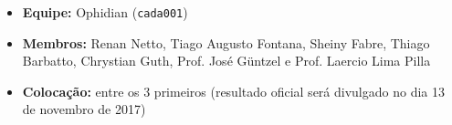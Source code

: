 \begin{itemize}
\item \textbf{Equipe:} Ophidian (\texttt{cada001})
\item \textbf{Membros:} Renan Netto, Tiago Augusto Fontana, Sheiny Fabre, Thiago Barbatto, Chrystian Guth, Prof. José Güntzel e Prof. Laercio Lima Pilla
\item \textbf{Colocação:} entre os 3 primeiros (resultado oficial será divulgado no dia 13 de novembro de 2017)
\end{itemize}
